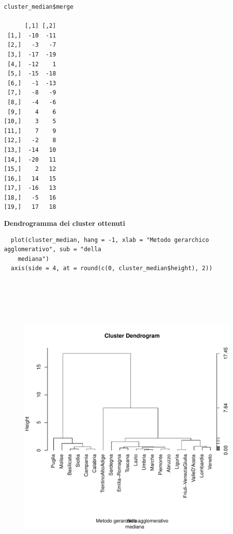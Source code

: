 \vspace{5mm}
\begin{lstlisting}
cluster_median$merge

      [,1] [,2]
 [1,]  -10  -11
 [2,]   -3   -7
 [3,]  -17  -19
 [4,]  -12    1
 [5,]  -15  -18
 [6,]   -1  -13
 [7,]   -8   -9
 [8,]   -4   -6
 [9,]    4    6
[10,]    3    5
[11,]    7    9
[12,]   -2    8
[13,]  -14   10
[14,]  -20   11
[15,]    2   12
[16,]   14   15
[17,]  -16   13
[18,]   -5   16
[19,]   17   18
\end{lstlisting}
\vspace{5mm}

\noindent \textbf{Dendrogramma dei cluster ottenuti}

\vspace{5mm}
\begin{lstlisting}
  plot(cluster_median, hang = -1, xlab = "Metodo gerarchico agglomerativo", sub = "della
    mediana")
  axis(side = 4, at = round(c(0, cluster_median$height), 2))
\end{lstlisting}
\vspace{5mm}

\vspace{5mm}
\begin{figure}[!htbp]
    \centering
    \includegraphics[height=16cm]{ProgettoSAD/capitoli/images/clustering/dendro_clmediana.pdf}
\end{figure}
\vspace{5mm}

